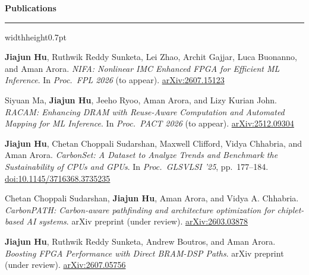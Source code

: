 \documentclass[10pt,letterpaper]{article}
\newcommand{\cvsection}[1]{%
  \vspace{3pt}\par\nopagebreak
  {\normalsize\bfseries\color{navy}#1\par}\vspace{1pt}\nopagebreak
  {\color{navy}\hrule width\linewidth height0.7pt}\nopagebreak
  \vspace{2pt}\nopagebreak}
\newenvironment{cvlist}{%
  \begin{list}{\textbullet}{%
    \setlength{\itemsep}{3pt}\setlength{\parsep}{0pt}%
    \setlength{\topsep}{0pt}\setlength{\partopsep}{0pt}%
    \setlength{\leftmargin}{1.2em}\setlength{\labelwidth}{0.7em}%
    \setlength{\labelsep}{0.5em}}}%
  {\end{list}}
\begin{document}
\cvsection{Publications}

\begin{cvlist}
  \item \textbf{Jiajun Hu}, Ruthwik Reddy Sunketa, Lei Zhao, Archit Gajjar, Luca Buonanno, and Aman Arora. \emph{NIFA: Nonlinear IMC Enhanced FPGA for Efficient ML Inference}. In \emph{Proc.\ FPL 2026} (to appear). \href{https://arxiv.org/abs/2607.15123}{arXiv:2607.15123}
  \item Siyuan Ma, \textbf{Jiajun Hu}, Jeeho Ryoo, Aman Arora, and Lizy Kurian John. \emph{RACAM: Enhancing DRAM with Reuse-Aware Computation and Automated Mapping for ML Inference}. In \emph{Proc.\ PACT 2026} (to appear). \href{https://arxiv.org/abs/2512.09304}{arXiv:2512.09304}
  \item \textbf{Jiajun Hu}, Chetan Choppali Sudarshan, Maxwell Clifford, Vidya Chhabria, and Aman Arora. \emph{CarbonSet: A Dataset to Analyze Trends and Benchmark the Sustainability of CPUs and GPUs}. In \emph{Proc.\ GLSVLSI '25}, pp.~177--184. \href{https://doi.org/10.1145/3716368.3735235}{doi:10.1145/3716368.3735235}
  \item Chetan Choppali Sudarshan, \textbf{Jiajun Hu}, Aman Arora, and Vidya A. Chhabria. \emph{CarbonPATH: Carbon-aware pathfinding and architecture optimization for chiplet-based AI systems}. arXiv preprint (under review). \href{https://arxiv.org/abs/2603.03878}{arXiv:2603.03878}
  \item \textbf{Jiajun Hu}, Ruthwik Reddy Sunketa, Andrew Boutros, and Aman Arora. \emph{Boosting FPGA Performance with Direct BRAM-DSP Paths}. arXiv preprint (under review). \href{https://arxiv.org/abs/2607.05756}{arXiv:2607.05756}
\end{cvlist}
\end{document}
